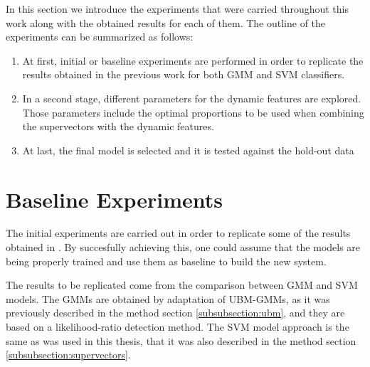 In this section we introduce the experiments that were carried throughout this work
along with the obtained results for each of them. The outline of the experiments can be
summarized as follows:

\begin{enumerate}
	\item At first, initial or baseline
	experiments are performed in order to replicate the results
	obtained in the previous work \cite{main} for both GMM and SVM classifiers.
	\item In a second stage, different parameters for the dynamic features are explored.
	Those parameters include the optimal proportions to be used when combining the
	supervectors with the dynamic features.
	\item At last, the final model is selected and it is tested against the hold-out data
\end{enumerate}

\section{Baseline Experiments}


The initial experiments are carried out in order to replicate some of
the results obtained in \cite{main}.
By succesfully achieving this, one could assume that the models are being properly trained
and use them as baseline to build the new system.

The results to be replicated come from the comparison between GMM and SVM models.
The GMMs are obtained by adaptation of UBM-GMMs, as it was previously described in
the method section \ref{subsubsection:ubm}, and they are based on
a likelihood-ratio detection method.
The SVM model approach is the same as was used in this thesis, that it was also described
in the method section \ref{subsubsection:supervectors}.

